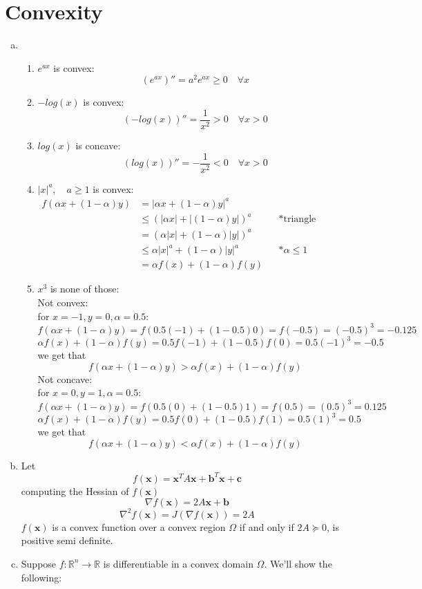 \documentclass{article}
\begin{document}
\section{Convexity}
\begin{enumerate}[(a)] 
\item \begin{enumerate}[label=\roman*.]
\item $e^{ax}$ is convex:
\[(e^{ax})'' = a^2e^{ax} \ge 0 \quad \forall x\]
\item $-log(x)$ is convex:
\[(-log(x))'' = \frac{1}{x^2} > 0 \quad \forall x > 0\]
\item $log(x)$ is concave:
\[(log(x))'' = -\frac{1}{x^2} < 0 \quad \forall x > 0\]
\item $|x|^a, \quad a \ge 1$ is convex:
\begin{align*}
f(\alpha x+(1-\alpha)y) &= |\alpha x+(1-\alpha)y|^a\\
&\le (|\alpha x|+|(1-\alpha)y|)^a && \text{*triangle inequality}\\
&= (\alpha |x|+(1-\alpha)|y|)^a \\
&\le \alpha |x|^a+(1-\alpha)|y|^a && *\alpha \le 1\\
&= \alpha f(x)+(1-\alpha)f(y)
\end{align*}
\item $x^3$ is none of those:\\
Not convex: \\
for $x=-1,y=0,\alpha=0.5$:
\[f(\alpha x+(1-\alpha)y) = f(0.5(-1)+(1-0.5)0) = f(-0.5) = (-0.5)^3 = -0.125\]
\[\alpha f(x)+(1-\alpha)f(y) = 0.5 f(-1)+(1-0.5)f(0) = 0.5(-1)^3 = -0.5\]
we get that
\[f(\alpha x+(1-\alpha)y) > \alpha f(x)+(1-\alpha)f(y)\]
Not concave: \\
for $x=0,y=1,\alpha=0.5$:
\[f(\alpha x+(1-\alpha)y) = f(0.5(0)+(1-0.5)1) = f(0.5) = (0.5)^3 = 0.125\]
\[\alpha f(x)+(1-\alpha)f(y) = 0.5 f(0)+(1-0.5)f(1) = 0.5(1)^3 = 0.5\]
we get that
\[f(\alpha x+(1-\alpha)y) < \alpha f(x)+(1-\alpha)f(y)\]
\end{enumerate}
\item Let
\[f(\mathbf{x}) = \mathbf{x}^TA\mathbf{x} + \mathbf{b}^T\mathbf{x} + \mathbf{c}\]
computing the Hessian of $f(\mathbf{x})$
\[\nabla f(\mathbf{x}) = 2A\mathbf{x} + \mathbf{b}\]
\[\nabla^2 f(\mathbf{x}) = J(\nabla f(\mathbf{x}) )= 2A\]
$ f(\mathbf{x})$ is a convex function over a convex region $\Omega$ if and only if $2A\succeq 0$, is positive semi definite.
\item Suppose $f:\mathbb{R}^n \rightarrow \mathbb{R}$ is differentiable in a convex domain $\Omega$. We'll show the following:

\end{enumerate}
\end{document}
